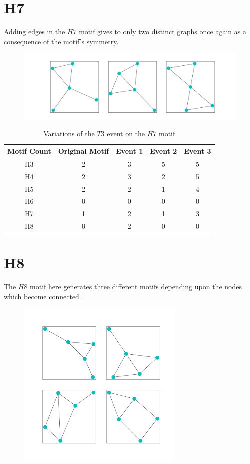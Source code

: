 \section{H7}
Adding edges in the $H7$ motif gives to only two distinct graphs once again as 
a consequence of the motif's symmetry. 
 
\begin{figure}[!ht]
    \includegraphics[width=12cm]{Images/H7_T3_evolution.png}
    \centering
\end{figure}

\begin{table}
    \centering
    \begin{tabular}{||c c c c c||} 
    \hline
    Motif Count & Original Motif & Event 1 & Event 2 & Event 3 \\ [0.5ex] 
    \hline\hline
    H3 & 2 & 3 & 5 & 5\\ 
    \hline
    H4 & 2 & 3 & 2 & 5 \\
    \hline
    H5 & 2 & 2 & 1 & 4 \\
    \hline
    H6 & 0 & 0 & 0 & 0 \\
    \hline
    H7 & 1 & 2 & 1 & 3 \\
    \hline
    H8 & 0 & 2 & 0 & 0\\
    \hline
   \end{tabular}
   \caption{Variations of the $T3$ event on the $H7$ motif}
   \label{table:16}
\end{table}

\section{H8}
The $H8$ motif here generates three different motifs depending upon the nodes which become connected.
\begin{figure}[!ht]
    \includegraphics[width=8cm]{Images/H8_T3_evolution.png}
    \centering
\end{figure}

